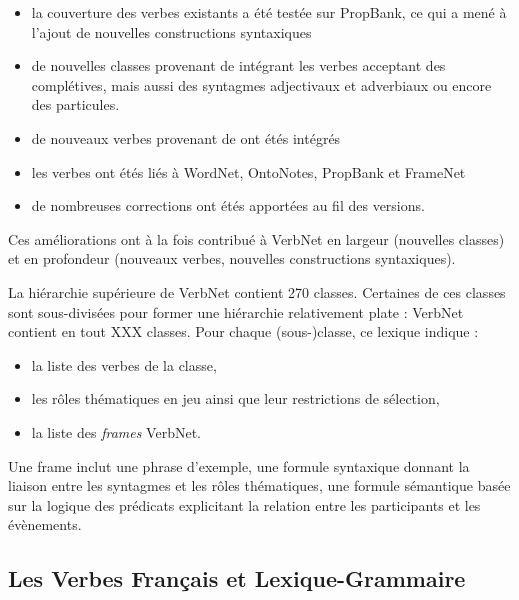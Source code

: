\begin{itemize}

    \item la couverture des verbes existants a été testée sur PropBank, ce qui
        a mené à l'ajout de nouvelles constructions syntaxiques

    \item de nouvelles classes provenant de \cite{korhonen2004extended}
        intégrant les verbes acceptant des complétives, mais aussi des
        syntagmes adjectivaux et adverbiaux ou encore des particules.

    \item de nouveaux verbes provenant de \cite{dorr2001lcs} ont étés intégrés

    \item les verbes ont étés liés à WordNet, OntoNotes, PropBank et FrameNet
        \citep{palmer2009semlink}

    \item de nombreuses corrections ont étés apportées au fil des versions.

\end{itemize}

Ces améliorations ont à la fois contribué à VerbNet en largeur (nouvelles
classes) et en profondeur (nouveaux verbes, nouvelles constructions
syntaxiques).

La hiérarchie supérieure de VerbNet contient 270 classes. Certaines de ces
classes sont sous-divisées pour former une hiérarchie relativement plate :
VerbNet contient en tout XXX classes. Pour chaque (sous-)classe, ce lexique
indique :

\begin{itemize}
        \item la liste des verbes de la classe,
        \item les rôles thématiques en jeu ainsi que leur restrictions de sélection,
        \item la liste des \emph{frames} VerbNet.
\end{itemize}

Une frame inclut une phrase d'exemple, une formule syntaxique donnant la
liaison entre les syntagmes et les rôles thématiques, une formule sémantique
basée sur la logique des prédicats explicitant la relation entre les
participants et les évènements.


\subsection{Les Verbes Français et Lexique-Grammaire}

